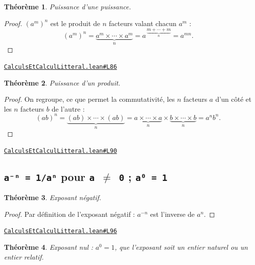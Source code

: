 \documentclass[11pt,a4paper]{article}
\theoremstyle{definition}
\theoremstyle{plain}
\newtheorem{theoreme}{Théorème}
\newcommand{\source}[2]{\par\smallskip\noindent\hfill{\footnotesize\href{#1}{\texttt{#2}}}\par\smallskip}
\begin{document}
\begin{theoreme}
Puissance d'une puissance.
\end{theoreme}

\begin{proof}
$(a^m)^n$ est le produit de $n$ facteurs valant chacun $a^m$ :
\[
(a^m)^n = \underbrace{a^m \times \cdots \times a^m}_{n}
        = a^{\,\underbrace{\scriptstyle m + \cdots + m}_{n}} = a^{mn} .
\]
\end{proof}
\source{https://github.com/Commutator-IO/learn-lean/blob/main/courses/01-college/01-nombres-et-calculs/CalculsEtCalculLitteral.lean\#L86}{CalculsEtCalculLitteral.lean\#L86}

\begin{theoreme}
Puissance d'un produit.
\end{theoreme}

\begin{proof}
On regroupe, ce que permet la commutativité, les $n$ facteurs $a$ d'un côté et les $n$
facteurs $b$ de l'autre :
\[
(ab)^n = \underbrace{(ab) \times \cdots \times (ab)}_{n}
       = \underbrace{a \times \cdots \times a}_{n} \times
         \underbrace{b \times \cdots \times b}_{n}
       = a^n b^n .
\]
\end{proof}
\source{https://github.com/Commutator-IO/learn-lean/blob/main/courses/01-college/01-nombres-et-calculs/CalculsEtCalculLitteral.lean\#L90}{CalculsEtCalculLitteral.lean\#L90}

\subsection{\texttt{a⁻ⁿ = 1/aⁿ} pour \texttt{a \(\ne\) 0} ; \texttt{a⁰ = 1}}

\begin{theoreme}
Exposant négatif.
\end{theoreme}

\begin{proof}
Par définition de l'exposant négatif : $a^{-n}$ est l'inverse de $a^n$.
\end{proof}
\source{https://github.com/Commutator-IO/learn-lean/blob/main/courses/01-college/01-nombres-et-calculs/CalculsEtCalculLitteral.lean\#L96}{CalculsEtCalculLitteral.lean\#L96}

\begin{theoreme}
Exposant nul : $a^0 = 1$, que l'exposant soit un entier naturel ou un entier relatif.
\end{theoreme}
\end{document}
